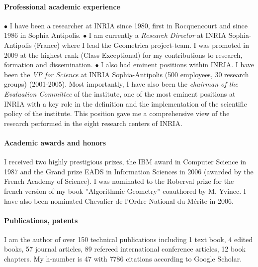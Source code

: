 \paragraph{Professional academic experience}\mbox{}

 $\bullet$ I have been a researcher at INRIA since 1980, first in Rocquencourt and since 1986 in Sophia Antipolis.  $\bullet$  I am currently a {\em Research Director} at INRIA Sophia-Antipolis (France) where I lead the Geometrica project-team. I was promoted in 2009 at the highest rank (Class Exceptional) for my contributions to research, formation and dissemination. $\bullet$ I also had eminent positions within INRIA. I have been 
the {\em VP for Science}  at INRIA Sophia-Antipolis (500 employees, 30 research groups) (2001-2005). Most importantly, 
I have also been  the {\em chairman of the Evaluation Committee} of the institute, one of the most eminent positions at INRIA with a key role in the definition and the implementation
of the scientific policy of the institute.  This position gave me  a comprehensive view of the research performed in the eight research centers of INRIA.



\paragraph{Academic awards and honors}\mbox{}

I received two highly prestigious prizes, the IBM award in Computer Science  in 1987
and the Grand prize EADS in Information Sciences in 2006 (awarded by the French Academy of Science).  I was nominated to the Roberval prize for the french version of my book ”Algorithmic Geometry” coauthored by M. Yvinec. I have also been nominated Chevalier de l'Ordre National du M\'erite in 2006.

\paragraph{Publications, patents} \mbox{}

I am the author of over 150 technical publications including 1 text book, 4 edited books, 57 journal articles, 89 refereed international conference articles, 12 book chapters. My h-number is 47 with 7786 citations according to Google Scholar. 

